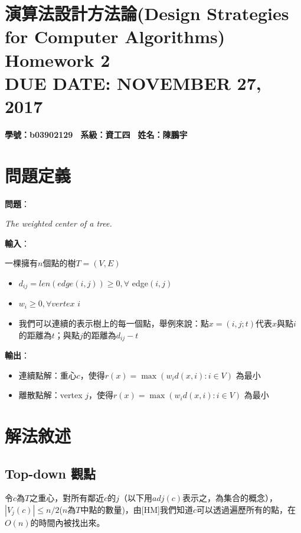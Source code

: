 \documentclass[15pt]{extarticle}
\begin{document}
 
\thispagestyle{empty}
\fontsize{12pt}{12pt}\selectfont
\section*{演算法設計方法論(Design Strategies for Computer Algorithms) \\
\normalsize{Homework 2} \\
\normalsize{DUE DATE: NOVEMBER 27, 2017}}

\hfill \textbf{學號：b03902129 \, 系級：資工四 \, 姓名：陳鵬宇} \\

\section{問題定義}
\textbf{問題}：\begin{minipage}[t]{0.8\linewidth}
    \textit{The weighted center of a tree.} \vskip0mm
\end{minipage}

\vskip3mm
\textbf{輸入}：
\begin{minipage}[t]{0.8\linewidth}
    一棵擁有$n$個點的樹$T=(V,E)$
    \begin{itemize}
        \item $d_{ij} = len(edge(i,j))\ge0,\forall$ edge$(i,j)$
        \item $w_i\ge0,\forall vertex$ $i$ 
        \item 我們可以連續的表示樹上的每一個點，舉例來說：點$x=(i,j;t)$代表$x$與點$i$的距離為$t$；與點$j$的距離為$d_{ij}-t$
    \end{itemize}
\end{minipage}

\vskip3mm
\textbf{輸出}：
\begin{minipage}[t]{0.8\linewidth}
\begin{itemize}
    \item 連續點解：重心$c$，使得$r(x)=\max(w_i d(x,i):i\in V)$ 為最小
    \item 離散點解：vertex $j$，使得$r(x)=\max(w_i d(x,i):i\in V)$ 為最小
\end{itemize}
\end{minipage}

\section{解法敘述}

\subsection{Top-down 觀點}
令$c$為$T$之重心，對所有鄰近$c$的$j$（以下用$adj(c)$表示之，為集合的概念），$|V_j(c)|\le n/2$($n$為$T$中點的數量)，由[HM]我們知道$c$可以透過遍歷所有的點，在$O(n)$的時間內被找出來。\\
\end{document}
